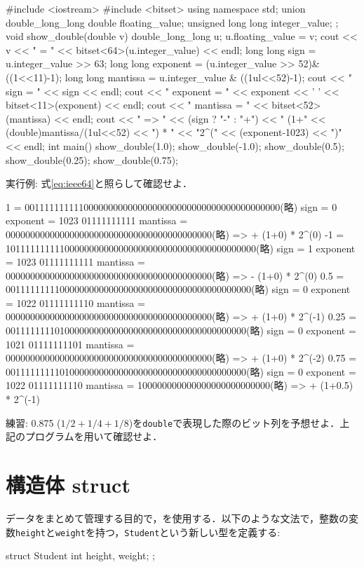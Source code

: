 \begin{cbox}
#include <iostream>
#include <bitset>
using namespace std;
union double_long_long {
  double floating_value;
  unsigned long long integer_value;
};
void show_double(double v) {
  double_long_long u;
  u.floating_value = v;
  cout << v << " = " << bitset<64>(u.integer_value) << endl;
  long long sign = u.integer_value >> 63;
  long long exponent = (u.integer_value >> 52)& ((1<<11)-1);
  long long mantissa = u.integer_value & ((1ul<<52)-1);
  cout << " sign = " << sign << endl;
  cout << " exponent = " << exponent << ' ' << bitset<11>(exponent) << endl;
  cout << " mantissa = " << bitset<52>(mantissa) << endl;
  cout << " => " << (sign ? "-" : "+")
       << " (1+" << (double)mantissa/(1ul<<52)
       << ") * " << "2^(" << (exponent-1023) << ")" << endl;
}
int main() {
  show_double(1.0);
  show_double(-1.0);
  show_double(0.5);
  show_double(0.25);
  show_double(0.75);
}  
\end{cbox}

実行例: 式\ref{eq:ieee64}と照らして確認せよ．
\begin{terminal}
1 = 0011111111110000000000000000000000000000000000000000(略)
 sign = 0
 exponent = 1023 01111111111
 mantissa = 000000000000000000000000000000000000000000(略)
 => + (1+0) * 2^(0)
-1 = 101111111111000000000000000000000000000000000000000(略)
 sign = 1
 exponent = 1023 01111111111
 mantissa = 000000000000000000000000000000000000000000(略)
 => - (1+0) * 2^(0)
0.5 = 00111111111000000000000000000000000000000000000000(略)
 sign = 0
 exponent = 1022 01111111110
 mantissa = 000000000000000000000000000000000000000000(略)
 => + (1+0) * 2^(-1)
0.25 = 0011111111010000000000000000000000000000000000000(略)
 sign = 0
 exponent = 1021 01111111101
 mantissa = 000000000000000000000000000000000000000000(略)
 => + (1+0) * 2^(-2)
0.75 = 0011111111101000000000000000000000000000000000000(略)
 sign = 0
 exponent = 1022 01111111110
 mantissa = 100000000000000000000000000(略)
 => + (1+0.5) * 2^(-1)  
\end{terminal}

練習: 0.875 ($1/2+1/4+1/8$)を\texttt{double}で表現した際のビット列を予想せよ．上記のプログラムを用いて確認せよ．

\section{構造体 struct}\label{section:struct}

データをまとめて管理する目的で，を使用する．以下のような文法で，整数の変数\texttt{height}と\texttt{weight}を持つ，\texttt{Student}という新しい型を定義する:
\begin{cbox}[emph=Student]
struct Student { 
  int height, weight;
};
\end{cbox}

